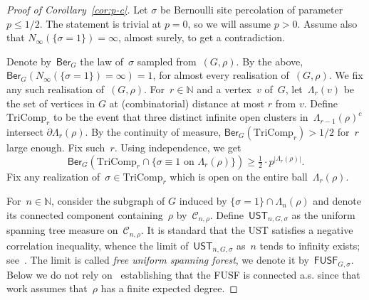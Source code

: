 \documentclass[11pt,letterpaper]{amsart}
\newcounter{n}
\numberwithin{n}{section}
\theoremstyle{plain}
\theoremstyle{definition}
\theoremstyle{remark}
\newcommand\N{\mathbb N}
\newcommand\calC{\mathcal C}
\newcommand{\1}{\mathbbm{1}}
\begin{document}
\begin{proof}[Proof of Corollary~\ref{cor:p-c}]
Let $\sigma$ be Bernoulli site percolation of parameter $p \leq 1/2$. The statement is trivial at $p=0$, so we will assume $p >0$. 
Assume also that $N_\infty(\{\sigma=1\}) = \infty$, almost surely, to get a contradiction.

Denote by~$\mathsf{Ber}_G$ the law of~$\sigma$ sampled from~$(G,\rho)$.
By the above, $\mathsf{Ber}_G(N_\infty(\{\sigma=1\}) = \infty)=1$, for almost every realisation of~$(G,\rho)$.
We fix any such realisation of~$(G,\rho)$.
For~$r \in \mathbb{N}$ and a vertex~$v$ of~$G$, let~$\Lambda_r(v)$ be the set of vertices in $G$ at (combinatorial) distance at most $r$ from $v$.
Define $\mathrm{TriComp}_r$ to be the event that three distinct infinite open clusters in~$\Lambda_{r-1}(\rho)^c$ intersect $\partial \Lambda_r(\rho)$.
By the continuity of measure, $\mathsf{Ber}_G(\mathrm{TriComp}_r)>1/2$ for~$r$ large enough.
Fix such~$r$.
Using independence, we get
\begin{equation}\label{eq:three-clust-sigma}
	\mathsf{Ber}_G(\mathrm{TriComp}_r \cap \{\sigma \equiv 1 \text{ on } \Lambda_r(\rho) \}) \geq \tfrac12\cdot p^{|\Lambda_r(\rho)|}.
\end{equation}
Fix any realization of~$\sigma\in\mathrm{TriComp}_r$ which is open on the entire ball~$\Lambda_r(\rho)$.

For~$n\in \N$, consider the subgraph of $G$ induced by $\{\sigma = 1\}\cap \Lambda_n(\rho)$ and denote its connected component containing~$\rho$ by~$\calC_{n,\rho}$.
Define~$\mathsf{UST}_{n,G,\sigma}$ as the uniform spanning tree measure on~$\calC_{n,\rho}$.
It is standard that the UST satisfies a negative correlation inequality, whence the limit of~$\mathsf{UST}_{n,G,\sigma}$  as~$n$ tends to infinity exists; see~\cite{BenLyoPerSch01}.
The limit is called {\em free uniform spanning forest}, we denote it by~$\mathsf{FUSF}_{G,\sigma}$. Below we do not rely on~\cite[Theorem~$5.13$]{AngHutNacRay18} establishing that the FUSF is connected a.s. since that work assumes that~$\rho$ has a finite expected degree.


\end{proof}
\end{document}
